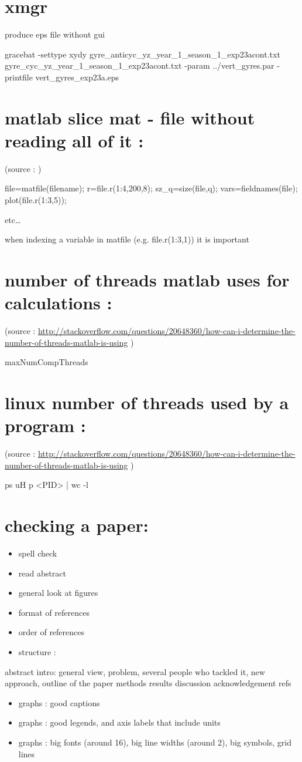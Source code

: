 \documentclass[11pt]{article}
\begin{document}
\section{xmgr}
\label{sec-40}
produce eps file without gui

gracebat -settype xydy gyre\_anticyc\_yz\_year\_1\_season\_1\_exp23acont.txt gyre\_cyc\_yz\_year\_1\_season\_1\_exp23acont.txt -param ../vert\_gyres.par -printfile vert\_gyres\_exp23a.eps
\section{matlab slice mat - file without reading all of it :}
\label{sec-41}
(source : )

file=matfile(filename);
r=file.r(1:4,200,8);
sz\_q=size(file,q);
vars=fieldnames(file); 
plot(file.r(1:3,5)); 

etc\ldots{}

when indexing a variable in matfile (e.g. file.r(1:3,1))
it is important 

\section{number of threads matlab uses for calculations :}
\label{sec-42}
(source : \url{http://stackoverflow.com/questions/20648360/how-can-i-determine-the-number-of-threads-matlab-is-using} )

maxNumCompThreads

\section{linux number of threads used by a program :}
\label{sec-43}
(source : \url{http://stackoverflow.com/questions/20648360/how-can-i-determine-the-number-of-threads-matlab-is-using} )


ps uH p <PID> | wc -l

\section{checking a paper:}
\label{sec-44}
\begin{itemize}
\item spell check
\item read abstract
\item general look at figures
\item format of references
\item order of references
\item structure :
\end{itemize}
abstract
intro: general view, problem, several people who tackled it, new approach, outline of the paper
methods
results
discussion
acknowledgement
refs
\begin{itemize}
\item graphs : good captions
\item graphs : good legends, and axis labels that include units
\item graphs : big fonts (around 16), big line widths (around 2), big symbols, grid lines
\end{itemize}
\end{document}
